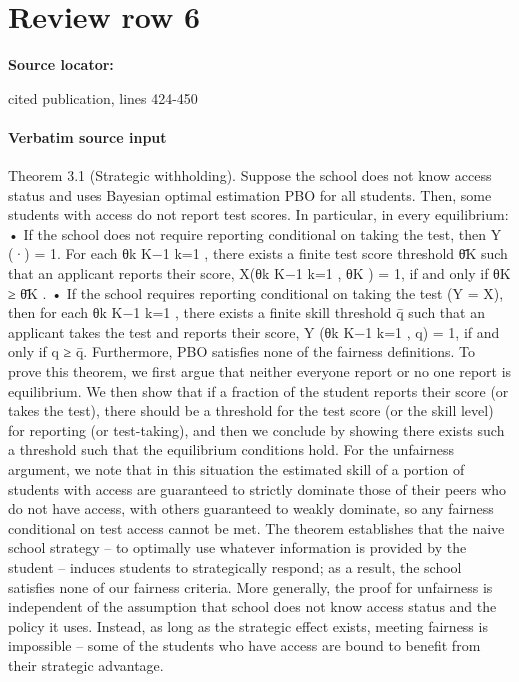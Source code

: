 \documentclass[10pt]{article}
\begin{document}
\section*{Review row 6}
\textbf{Source locator:} {\footnotesize\raggedright cited publication, lines 424-\allowbreak{}450\par}
\paragraph{Verbatim source input}
\begin{ReviewVerbatim}
Theorem 3.1 (Strategic withholding). Suppose the school does not know access status and uses
Bayesian optimal estimation PBO for all students. Then, some students with access do not report
test scores. In particular, in every equilibrium:
• If the school does not require reporting conditional on taking the test, then Y (·) = 1. For each
{θk }K−1
k=1 , there exists a finite test score threshold θ̄K such that an applicant reports their score,
X({θk }K−1
k=1 , θK ) = 1, if and only if θK ≥ θ̄K .
• If the school requires reporting conditional on taking the test (Y = X), then for each {θk }K−1
k=1 ,
there exists a finite skill threshold q̄ such that an applicant takes the test and reports their
score, Y ({θk }K−1
k=1 , q) = 1, if and only if q ≥ q̄.
Furthermore, PBO satisfies none of the fairness definitions.
To prove this theorem, we ﬁrst argue that neither everyone report or no one report is equilibrium.
We then show that if a fraction of the student reports their score (or takes the test), there should
be a threshold for the test score (or the skill level) for reporting (or test-taking), and then we
conclude by showing there exists such a threshold such that the equilibrium conditions hold. For
the unfairness argument, we note that in this situation the estimated skill of a portion of students
with access are guaranteed to strictly dominate those of their peers who do not have access, with
others guaranteed to weakly dominate, so any fairness conditional on test access cannot be met.
The theorem establishes that the naive school strategy – to optimally use whatever information
is provided by the student – induces students to strategically respond; as a result, the school
satisﬁes none of our fairness criteria. More generally, the proof for unfairness is independent of the
assumption that school does not know access status and the policy it uses. Instead, as long as the
strategic eﬀect exists, meeting fairness is impossible – some of the students who have access are
bound to beneﬁt from their strategic advantage.


\end{ReviewVerbatim}
\end{document}
